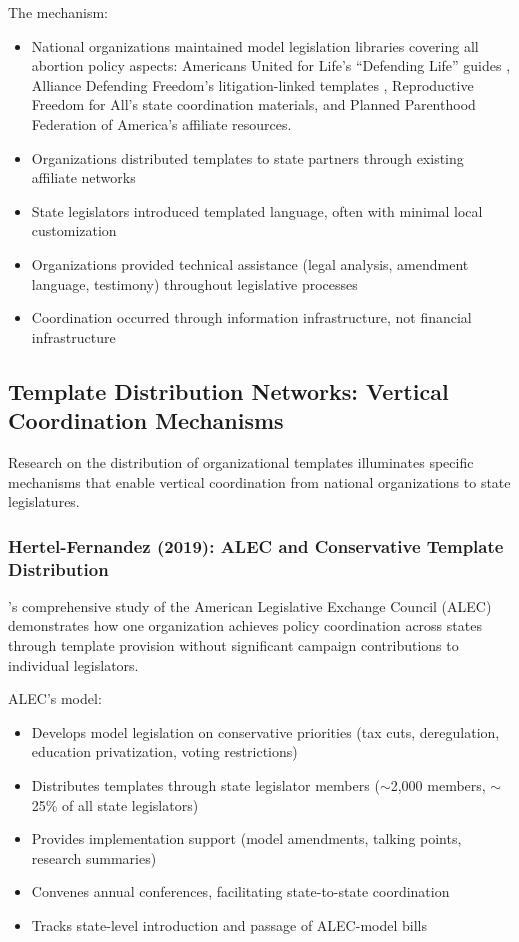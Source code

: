 The mechanism:

\begin{itemize}
\item National organizations maintained model legislation libraries covering all abortion policy aspects: Americans United for Life's ``Defending Life'' guides \parencite{sheppardWhamBamSonogram2012}, Alliance Defending Freedom's litigation-linked templates \parencite{kirkpatrickGroupThatOverturned2023}, Reproductive Freedom for All's state coordination materials, and Planned Parenthood Federation of America's affiliate resources.
\item Organizations distributed templates to state partners through existing affiliate networks
\item State legislators introduced templated language, often with minimal local customization
\item Organizations provided technical assistance (legal analysis, amendment language, testimony) throughout legislative processes
\item Coordination occurred through information infrastructure, not financial infrastructure
\end{itemize}

\subsection{Template Distribution Networks: Vertical Coordination Mechanisms}

Research on the distribution of organizational templates illuminates specific mechanisms that enable vertical coordination from national organizations to state legislatures.

\subsubsection{Hertel-Fernandez (2019): ALEC and Conservative Template Distribution}

\textcite{hertel-fernandezStateCapture2019}'s comprehensive study of the American Legislative Exchange Council (ALEC) demonstrates how one organization achieves policy coordination across states through template provision without significant campaign contributions to individual legislators.

ALEC's model:
\begin{itemize}
\item Develops model legislation on conservative priorities (tax cuts, deregulation, education privatization, voting restrictions)
\item Distributes templates through state legislator members ($\sim$2,000 members, $\sim$25\% of all state legislators)
\item Provides implementation support (model amendments, talking points, research summaries)
\item Convenes annual conferences, facilitating state-to-state coordination
\item Tracks state-level introduction and passage of ALEC-model bills
\end{itemize}

